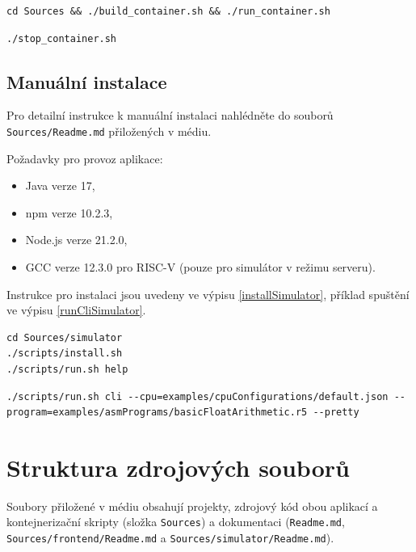 \begin{lstlisting}[caption={Vytvoření a spuštění celé aplikace.},label=runContainer]
cd Sources && ./build_container.sh && ./run_container.sh
\end{lstlisting}

\begin{lstlisting}[caption={Zastavení obou kontejnerů.},label=stopContainer]
./stop_container.sh
\end{lstlisting}

\section{Manuální instalace}

Pro detailní instrukce k manuální instalaci nahlédněte do souborů \texttt{Sources/Readme.md} přiložených v médiu.

Požadavky pro provoz aplikace:
\begin{itemize}
    \item Java verze 17,
    \item npm verze 10.2.3,
    \item Node.js verze 21.2.0,
    \item GCC verze 12.3.0 pro RISC-V (pouze pro simulátor v režimu serveru).
\end{itemize}

Instrukce pro instalaci jsou uvedeny ve výpisu \ref{installSimulator}, příklad spuštění ve výpisu \ref{runCliSimulator}.

\begin{lstlisting}[caption={Posloupnost příkazů k instalaci a spuštění simulátoru.},label=installSimulator]
cd Sources/simulator
./scripts/install.sh
./scripts/run.sh help
\end{lstlisting}

\begin{lstlisting}[caption={Příklad supštění simulace v režimu CLI.},label=runCliSimulator]
./scripts/run.sh cli --cpu=examples/cpuConfigurations/default.json --program=examples/asmPrograms/basicFloatArithmetic.r5 --pretty
\end{lstlisting}


\chapter{Struktura zdrojových souborů}
\label{sourcemap}

Soubory přiložené v médiu obsahují projekty, zdrojový kód obou aplikací a kontejnerizační skripty (složka \texttt{Sources}) a dokumentaci (\texttt{Readme.md}, \texttt{Sources/frontend/Readme.md} a \texttt{Sources/simulator/Readme.md}).

